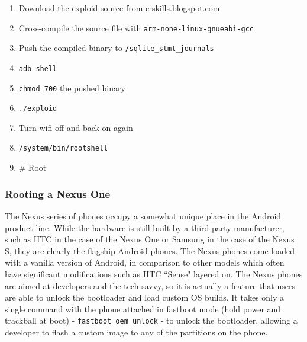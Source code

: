 \begin{enumerate}
	\item Download the exploid source from \url{c-skills.blogspot.com}
	\item Cross-compile the source file with \texttt{arm-none-linux-gnueabi-gcc}
	\item Push the compiled binary to \texttt{/sqlite\_stmt\_journals}
	\item \texttt{adb shell}
	\item \texttt{chmod 700} the pushed binary
	\item \texttt{./exploid}
	\item Turn wifi off and back on again
	\item \texttt{/system/bin/rootshell}
	\item {\# Root}
\end{enumerate}

\subsubsection{Rooting a Nexus One}

The Nexus series of phones occupy a somewhat unique place in the Android product line.  While the hardware is still built by a
third-party manufacturer, such as HTC in the case of the Nexus One or Samsung in the case of the Nexus S, they are clearly the
flagship Android phones.  The Nexus phones come loaded with a vanilla version of Android, in comparison to other models which often
have significant modifications such as HTC ``Sense" layered on.  The Nexus phones are aimed at developers and the tech savvy, so it
is actually a feature that users are able to unlock the bootloader and load custom OS builds.  It takes only a single command with
the phone attached in fastboot mode (hold power and trackball at boot) - \texttt{fastboot oem unlock} - to unlock the bootloader,
allowing a developer to flash a custom image to any of the partitions on the phone.

